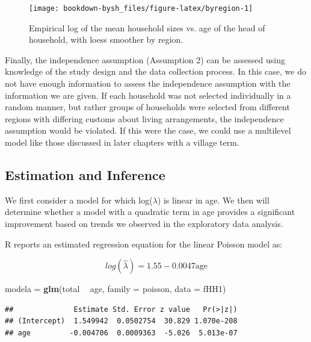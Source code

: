 \documentclass[
]{krantz}
\newenvironment{Shaded}{\begin{snugshade}}{\end{snugshade}}
\newcommand{\DataTypeTok}[1]{\textcolor[rgb]{0.27,0.27,0.27}{#1}}
\newcommand{\KeywordTok}[1]{\textcolor[rgb]{0.27,0.27,0.27}{\textbf{#1}}}
\newcommand{\NormalTok}[1]{#1}
\newcommand{\OperatorTok}[1]{\textcolor[rgb]{0.43,0.43,0.43}{\textbf{#1}}}
\newcommand{\StringTok}[1]{\textcolor[rgb]{0.5,0.5,0.5}{#1}}
\begin{document}
\begin{figure}

{\centering \texttt{[image: bookdown-bysh\_files/figure-latex/byregion-1]} 

}

\caption{Empirical log of the mean household sizes vs. age of the head of household, with loess smoother by region.}\label{fig:byregion}
\end{figure}

Finally, the independence assumption (Assumption 2) can be assessed using knowledge of the study design and the data collection process. In this case, we do not have enough information to assess the independence assumption with the information we are given. If each household was not selected individually in a random manner, but rather groups of households were selected from different regions with differing customs about living arrangements, the independence assumption would be violated. If this were the case, we could use a multilevel model like those discussed in later chapters with a village term.

\hypertarget{sec-PoisInference}{%
\subsection{Estimation and Inference}\label{sec-PoisInference}}

We first consider a model for which log(\(\lambda\)) is linear in age. We then will determine whether a model with a quadratic term in age provides a significant improvement based on trends we observed in the exploratory data analysis.

R reports an estimated regression equation for the linear Poisson model as:

\begin{equation*}
log(\hat{\lambda}) = 1.55 - 0.0047 \textrm{age}
\end{equation*}

\begin{Shaded}
\begin{Highlighting}[]
\NormalTok{modela =}\StringTok{ }\KeywordTok{glm}\NormalTok{(total }\OperatorTok{~}\StringTok{ }\NormalTok{age, }\DataTypeTok{family =}\NormalTok{ poisson, }\DataTypeTok{data =}\NormalTok{ fHH1)}
\end{Highlighting}
\end{Shaded}

\begin{verbatim}
##              Estimate Std. Error z value   Pr(>|z|)
## (Intercept)  1.549942  0.0502754  30.829 1.070e-208
## age         -0.004706  0.0009363  -5.026  5.013e-07
\end{verbatim}
\end{document}
